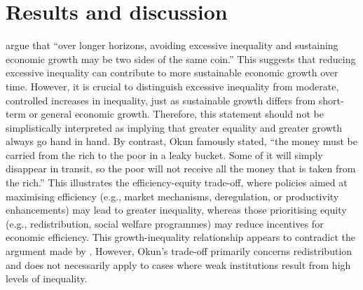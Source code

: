 \section{Results and discussion}

\textcite{berg2017inequality} argue that ``over longer horizons, avoiding excessive inequality and sustaining economic growth may be two sides of the same coin.'' This suggests that reducing excessive inequality can contribute to more sustainable economic growth over time. However, it is crucial to distinguish excessive inequality from moderate, controlled increases in inequality, just as sustainable growth differs from short-term or general economic growth. Therefore, this statement should not be simplistically interpreted as implying that greater equality and greater growth always go hand in hand. By contrast, Okun \parencite*{okun2010equality} famously stated, ``the money must be carried from the rich to the poor in a leaky bucket. Some of it will simply disappear in transit, so the poor will not receive all the money that is taken from the rich.'' This illustrates the efficiency-equity trade-off, where policies aimed at maximising efficiency (e.g., market mechanisms, deregulation, or productivity enhancements) may lead to greater inequality, whereas those prioritising equity (e.g., redistribution, social welfare programmes) may reduce incentives for economic efficiency. This growth-inequality relationship appears to contradict the argument made by \textcite{berg2017inequality}. However, Okun's trade-off primarily concerns redistribution and does not necessarily apply to cases where weak institutions result from high levels of inequality.

